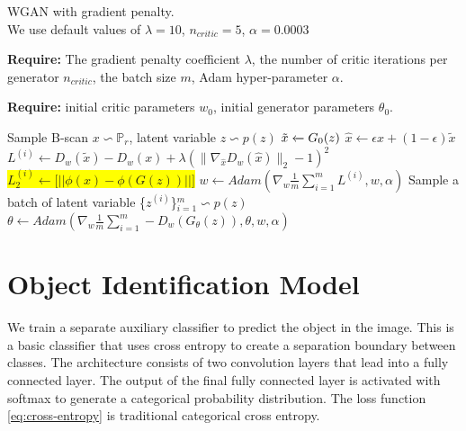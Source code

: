\begin{algorithm}[H]
  \caption{WGAN with gradient penalty. \\
  We use default values of $\lambda =10$, $n_{critic} = 5$, $\alpha = 0.0003$}\label{euclid}
  
  \textbf{Require:} The gradient penalty coefficient $\lambda$, the number of critic iterations per generator $n_{critic}$, the batch size $m$, Adam hyper-parameter $\alpha$.



\textbf{Require:} initial critic parameters $w_{0}$, initial generator parameters $\theta_{0}$.
  \begin{algorithmic}[1]
   
                \State Sample B-scan $x \backsim \mathbb{P} _{r}$, latent variable $z \backsim p(z)$
                \State $\Tilde{x} \xleftarrow[]{}G_{0}(z)$
                \State $\hat{x} \xleftarrow{}\epsilon x + (1 - \epsilon) \tilde{x}$
                \State $L^{(i)} \xleftarrow{} D_{w}(\tilde{x}) - D_{w}(x) + \lambda(\|{\nabla_{\hat{x}} D_{w}(\hat{x})}\|_{2} - 1)^2$
                \State \colorbox{yellow}{$L_{2}^{(i)} \xleftarrow{} \Big[ \big|\big| \phi(x) - \phi(G(z)) \big|\big| \Big]$}
            \EndFor
            \State $w \xleftarrow{} Adam (\nabla_{w} \frac{1}{m} \sum_{i=1}^{m} L^{(i)}, w, \alpha)$
        \EndFor
        \State Sample a batch of latent variable \{${z^{(i)}}$\}$_{i=1}^{m} \backsim p(z)$
        \State $\theta \xleftarrow{} Adam (\nabla_{w} \frac{1}{m} \sum_{i=1}^{m} -D_{w}(G_{\theta}(z)), \theta, w, \alpha)$
      \EndWhile\label{euclidendwhile}
  \end{algorithmic}
  \label{alg}
\end{algorithm}

\section{Object Identification Model}
We train a separate auxiliary classifier to predict the object in the image. This is a basic classifier that uses cross entropy to create a separation boundary between classes. The architecture consists of two convolution layers that lead into a fully connected layer. The output of the final fully connected layer is activated with softmax to generate a categorical probability distribution. The loss function \ref{eq:cross-entropy} is traditional categorical cross entropy.

